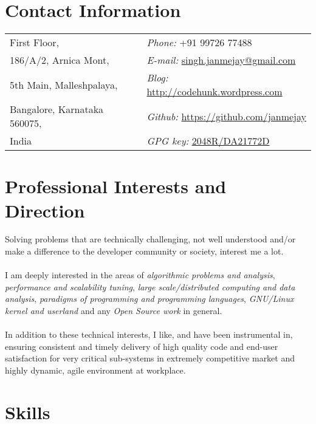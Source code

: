 \documentclass[margin,line]{res}
\begin{document}

\begin{resume}
  \section{\sc Contact Information}
  \vspace{.05in}
  \begin{tabular}{@{}p{2in}p{4in}}
    First Floor,                 & {\it Phone:}  +91 99726 77488 \\            
    186/A/2, Arnica Mont,        & {\it E-mail:}  \href{mailto:singh.janmejay@gmail.com}{singh.janmejay@gmail.com}\\       
    5th Main, Malleshpalaya,     & {\it Blog:}    \url{http://codehunk.wordpress.com} \\         
    Bangalore, Karnataka 560075, & {\it Github:} \url{https://github.com/janmejay} \\     
    India                        & {\it GPG key:} \href{http://pgp.mit.edu:11371/pks/lookup?op=vindex&search=0x3A9F2343DA21772D}{2048R/DA21772D}\\
  \end{tabular}


\section{\sc Professional Interests and Direction}
Solving problems that are technically challenging, not well understood and/or make a difference to the developer community or society, interest me a lot.\\
\\
I am deeply interested in the areas of {\it algorithmic problems and analysis}, {\it performance and scalability tuning}, {\it large scale/distributed computing and data analysis}, {\it paradigms of programming and programming languages}, {\it GNU/Linux kernel and userland} and any {\it Open Source work} in general.\\
\\
In addition to these technical interests, I like, and have been instrumental in, ensuring consistent and timely delivery of high quality code and end-user satisfaction for very critical sub-systems in extremely competitive market and highly dynamic, agile environment at workplace.

\section{\sc Skills}


\end{resume}
\end{document}
